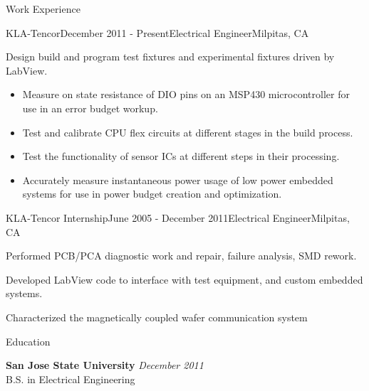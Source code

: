 \documentclass{resume} %
\begin{document}
\begin{rSection}{Work Experience}
\begin{rSubsection}{KLA-Tencor}{December 2011 - Present}{Electrical Engineer}{Milpitas, CA}
\item Design build and program test fixtures and experimental fixtures driven by LabView.
\begin{itemize}
\itemsep -0.5em \vspace{-0.5em}
\renewcommand{\labelitemi}{-}
\item Measure on state resistance of DIO pins on an MSP430 microcontroller for use in an error budget workup.
\item Test and calibrate CPU flex circuits at different stages in the build process.
\item Test the functionality of sensor ICs at different steps in their processing.
\item Accurately measure instantaneous power usage of low power embedded systems for use in power budget creation and optimization.
\end{itemize}


\end{rSubsection}


\begin{rSubsection}{KLA-Tencor Internship}{June 2005 - December 2011}{Electrical Engineer}{Milpitas, CA}
\item Performed PCB/PCA diagnostic work and repair, failure analysis, SMD rework.
\item Developed LabView code to interface with test equipment, and custom embedded systems.
\item Characterized the magnetically coupled wafer communication system
\end{rSubsection}

\end{rSection}


\begin{rSection}{Education}

{\bf San Jose State University} \hfill {\em December 2011} \\ 
B.S. in Electrical Engineering \\

\end{rSection}





\end{document}
